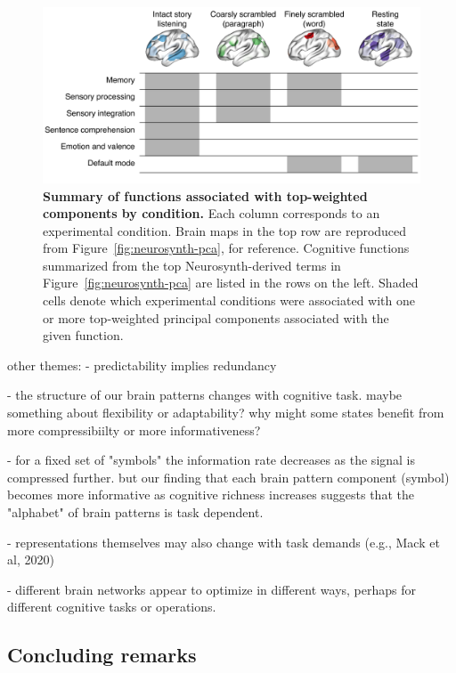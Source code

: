 \documentclass[english, 11pt]{article}
\begin{document}
\begin{figure}[tp]
  \centering
  \includegraphics[width=\textwidth]{figs/discussion}

\caption{\textbf{Summary of functions associated with top-weighted components
by condition.} Each column corresponds to an experimental condition. Brain maps
in the top row are reproduced from Figure~\ref{fig:neurosynth-pca}, for
reference. Cognitive functions summarized from the top Neurosynth-derived terms
in Figure~\ref{fig:neurosynth-pca} are listed in the rows on the left.  Shaded cells
denote which experimental conditions were associated with one or more top-weighted
principal components associated with the given function.}

\label{fig:discussion}
\end{figure}


other themes:
- predictability implies redundancy

- the structure of our brain patterns changes with cognitive task. maybe
something about flexibility or adaptability? why might some states benefit from
more compressibiilty or more informativeness?

- for a fixed set of "symbols" the information rate decreases as the signal is
compressed further. but our finding that each brain pattern component (symbol)
becomes more informative as cognitive richness increases suggests that the
"alphabet" of brain patterns is task dependent.

- representations themselves may also change with task demands (e.g., Mack et al, 2020)

- different brain networks appear to optimize in different ways, perhaps for different
cognitive tasks or operations.


\subsection*{Concluding remarks}
\end{document}
